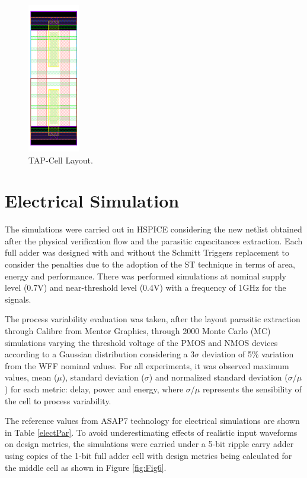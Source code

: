 \documentclass[ecp,tc, english]{iiufrgs}
\begin{document}
\begin{figure}[H]
\centering
\includegraphics[width=0.2\textwidth]{TAP.png}
\caption{TAP-Cell Layout.}
\label{tap}
\end{figure}

\section{Electrical Simulation}

The simulations were carried out in HSPICE considering the new netlist obtained after the physical verification flow and the parasitic capacitances extraction. Each full adder was designed with and without the Schmitt Triggers replacement to consider the penalties due to the adoption of the ST technique in terms of area, energy and performance. There was performed simulations at nominal supply level (0.7V) and near-threshold level (0.4V) with a frequency of 1GHz for the signals. 

The process variability evaluation was taken, after the layout parasitic extraction through Calibre\textregistered{} from Mentor Graphics, through 2000 Monte Carlo (MC) simulations \cite{2000Simulations} varying the threshold voltage of the PMOS and NMOS devices according to a Gaussian distribution considering a 3\(\sigma\) deviation of 5\% variation from the WFF nominal values. For all experiments, it was observed maximum values, mean (\(\mu\)), standard deviation (\(\sigma\)) and normalized standard deviation (\(\sigma\)/\(\mu\)) for each metric: delay, power and energy, where \(\sigma\)/\(\mu\) represents the sensibility of the cell to process variability. 

The reference values from ASAP7 technology for electrical simulations are shown in Table \ref{electPar}. To avoid underestimating effects of realistic input waveforms on design metrics, the simulations were carried under a 5-bit ripple carry adder using copies of the 1-bit full adder cell with design metrics being calculated for the middle cell as shown in Figure \ref{fig:Fig6}. 
\end{document}
